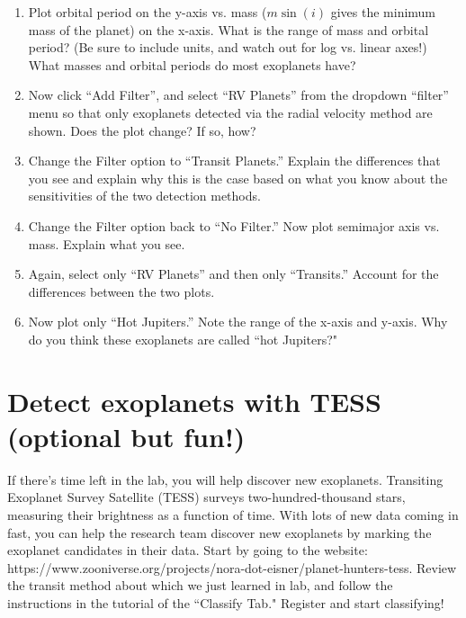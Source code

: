 \documentclass[12pt]{article}%
\begin{document}
\begin{enumerate}
\item Plot orbital period on the y-axis vs. mass ($m \sin(i)$ gives the minimum mass of the planet) on the x-axis.  
What is the range of mass and orbital period?  (Be sure to include units, and watch out for log vs. linear axes!)  
What masses and orbital periods do most exoplanets have?
\item Now click ``Add Filter'', and select ``RV Planets'' from the dropdown ``filter'' menu so that only exoplanets detected via the radial velocity method are shown.  
Does the plot change? If so, how?  
\item Change the Filter option to ``Transit Planets.'' 
Explain the differences that you see and explain why this is the case based on what you know about the sensitivities of the two detection methods.
\item Change the Filter option back to ``No Filter.'' 
Now plot semimajor axis vs. mass. Explain what you see.
\item Again, select only ``RV Planets'' and then only ``Transits.''
Account for the differences between the two plots.
\item Now plot only ``Hot Jupiters.''  Note the range of the x-axis and y-axis. 
Why do you think these exoplanets are called ``hot Jupiters?"
\end{enumerate}

\section{Detect exoplanets with TESS (optional but fun!)}

If there's time left in the lab, you will help discover new exoplanets. Transiting Exoplanet Survey Satellite (TESS) surveys two-hundred-thousand stars, measuring their brightness as a function of time. With lots of new data coming in fast, you can help the research team discover new exoplanets by marking the exoplanet candidates in their data. Start by going to the website: https://www.zooniverse.org/projects/nora-dot-eisner/planet-hunters-tess. Review the transit method about which we just learned in lab, and follow the instructions in the tutorial of the ``Classify Tab." Register and start classifying! 
\end{document}
